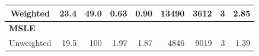 \documentclass[a4paper,fleqn]{cas-sc}
\begin{document}
\begin{table}[]
\begin{tabular}{crrrrrrrr}
Weighted                                                                                                   & 23.4                                                                                   & 49.0                                                                                        & 0.63                                                                            & 0.90                                                                                          & 13490                                                                                     & 3612                                                                                               & 3                                                                                       & 2.85                                                                                   \\ \hline
\multicolumn{9}{l}{\textbf{MSLE}}                                                                                                                                                                                                                                                                                                                                                                                                                                                                                                                                                                                                                                                                                                                                                                                                                                       \\
Unweighted                                                                                                 & 19.5                                                                                   & 100                                                                                         & 1.97                                                                            & 1.87                                                                                          & 4846                                                                                      & 9019                                                                                               & 3                                                                                       & 1.39                                                                                   \\

\end{tabular}
\end{table}
\end{document}
